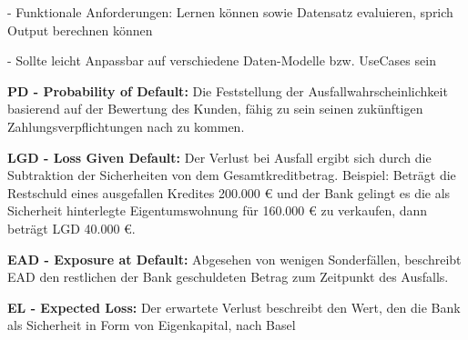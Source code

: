 - Funktionale Anforderungen: Lernen können sowie Datensatz evaluieren, sprich Output berechnen können

- Sollte leicht Anpassbar auf verschiedene Daten-Modelle bzw. UseCases sein 

\begin{itemize*}
\item \textbf{PD - Probability of Default:} Die Feststellung der Ausfallwahrscheinlichkeit basierend auf der Bewertung des Kunden, fähig zu sein seinen zukünftigen Zahlungsverpflichtungen nach zu kommen.     
\item \textbf{LGD - Loss Given Default:} Der Verlust bei Ausfall ergibt sich durch die Subtraktion der Sicherheiten von dem Gesamtkreditbetrag. Beispiel: Beträgt die Restschuld eines ausgefallen Kredites 200.000 \euro \hspace{1mm} und der Bank gelingt es die als Sicherheit hinterlegte Eigentumswohnung für 160.000 \euro \hspace{1mm} zu verkaufen, dann beträgt LGD 40.000 \euro.     
\item \textbf{EAD - Exposure at Default:} Abgesehen von wenigen Sonderfällen, beschreibt EAD den restlichen der Bank geschuldeten Betrag zum Zeitpunkt des Ausfalls.
\item \textbf{EL - Expected Loss:} Der erwartete Verlust beschreibt den Wert, den die Bank als Sicherheit in Form von Eigenkapital, nach Basel          
\end{itemize*}
